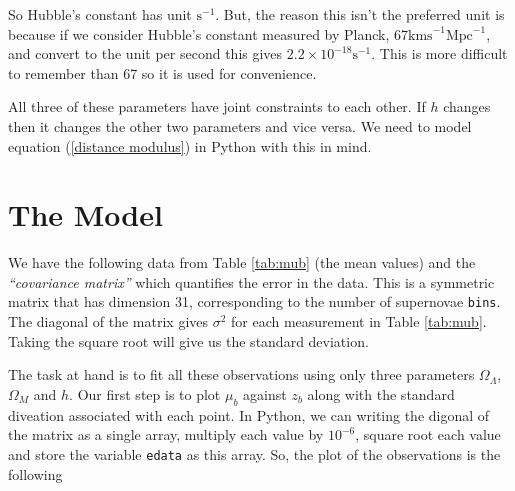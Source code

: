 \documentclass[12pt,twoside]{report}   %
\begin{document}
So Hubble's constant has unit $\mathrm{s}^{-1}$. But, the reason this isn't the preferred unit is because if we consider Hubble's constant measured by Planck, 67$\mathrm{kms}^{-1}\mathrm{Mpc}^{-1}$, and convert to the unit per second this gives $2.2\times10^{-18}\mathrm{s}^{-1}$. This is more difficult to remember than 67 so it is used for convenience.

All three of these parameters have joint constraints to each other. If $h$ changes then it changes the other two parameters and vice versa. We need to model equation (\ref{distance modulus}) in Python with this in mind.

\section{The Model}\label{The Model4}

We have the following data from Table \ref{tab:mub} (the mean values) and the \textit{``covariance matrix''} which quantifies the error in the data. This is a symmetric matrix that has dimension 31, corresponding to the number of supernovae \texttt{bins}. The diagonal of the matrix gives $\sigma^2$ for each measurement in Table \ref{tab:mub}. Taking the square root will give us the standard deviation.

The task at hand is to fit all these observations using only three parameters $\Omega_\Lambda$, $\Omega_M$ and $h$. Our first step is to plot $\mu_b$ against $z_b$ along with the standard diveation associated with each point. In Python, we can writing the digonal of the matrix as a single array, multiply each value by $10^{-6}$, square root each value and store the variable \texttt{edata} as this array. So, the plot of the observations is the following 
\end{document}
